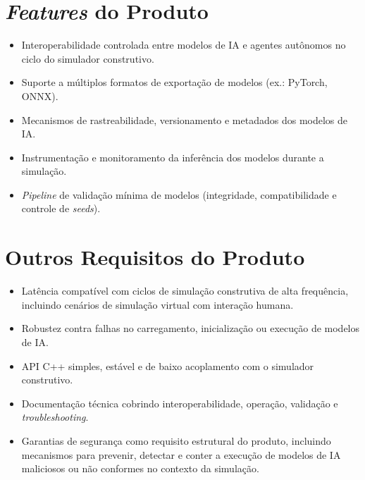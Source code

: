 \section{\emph{Features} do Produto}

\begin{itemize}
    \item Interoperabilidade controlada entre modelos de IA e agentes autônomos no ciclo do simulador construtivo.
    \item Suporte a múltiplos formatos de exportação de modelos (ex.: PyTorch, ONNX).
    \item Mecanismos de rastreabilidade, versionamento e metadados dos modelos de IA.
    \item Instrumentação e monitoramento da inferência dos modelos durante a simulação.
    \item \emph{Pipeline} de validação mínima de modelos (integridade, compatibilidade e controle de \emph{seeds}).
\end{itemize}

\section{Outros Requisitos do Produto}

\begin{itemize}
    \item Latência compatível com ciclos de simulação construtiva de alta frequência, incluindo cenários de simulação virtual com interação humana.
    \item Robustez contra falhas no carregamento, inicialização ou execução de modelos de IA.
    \item API C++ simples, estável e de baixo acoplamento com o simulador construtivo.
    \item Documentação técnica cobrindo interoperabilidade, operação, validação e \emph{troubleshooting}.
    \item Garantias de segurança como requisito estrutural do produto, incluindo mecanismos para prevenir, detectar e conter a execução de modelos de IA maliciosos ou não conformes no contexto da simulação.
\end{itemize}
